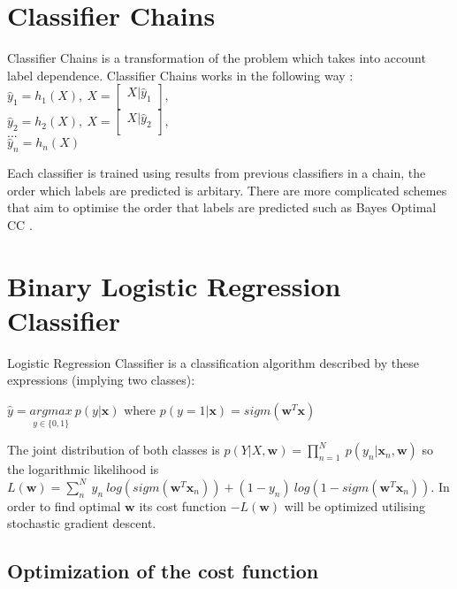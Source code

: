 \documentclass[10pt,letterpaper]{article}
\begin{document}
	\section*{Classifier Chains}
	Classifier Chains is a transformation of the problem which takes into account label dependence. Classifier Chains works in the following way \cite{MLC_finland}:\\ %
	$ 
	\hat{y}_{1} = h_{1}(X) ,  	\ 
	X = 	
	\begin{bmatrix}
		X	| \hat{y}_{1} \\
	\end{bmatrix}
	,$\\
	
	$ \hat{y}_{2} = h_{2}(X) ,  	\ 
	X = 	
	\begin{bmatrix}
	X	| \hat{y}_{2} \\
	\end{bmatrix} 
	,$
	\\
	$  	
	...  
	$
	\\
	$\hat{y}_{n} = h_{n}(X) $
	\newline
	
	Each classifier is trained using results from previous classifiers in a chain, the order which labels are predicted is %
	arbitary. There are more complicated schemes that aim to optimise the order that labels are predicted such as Bayes Optimal CC \cite{MLC_finland}.
	
	\section*{Binary Logistic Regression Classifier}
	Logistic Regression Classifier is a  classification algorithm described by these expressions (implying two classes): 
	
	$ \hat{y} = \underset{y \in \{0,1\} }{argmax}\  p(y|\textbf{x})
	$
	 where $
	 p(y = 1 | \textbf{x} )= sigm(\textbf{w}^T \textbf{x} )
	 $
	
	The joint distribution of both classes is $p(Y |X,\textbf{w}) = \prod_{n=1}^{N} \ p({y}_{n} | \textbf{x}_{n}, \textbf{w} )$
	 so the logarithmic likelihood is $
	 L(\textbf{w}) = \sum_{n}^{N} \ y_n \ log(sigm(\textbf{w}^T \textbf{x}_n)) + (1-y_n)\ log(1 - sigm(\textbf{w}^T \textbf{x}_n))
	 $.
	 In order to find optimal $\textbf{w}$ its cost function $-L(\textbf{w})$ will be optimized utilising stochastic gradient descent.
	 
	 \subsection*{Optimization of the cost function}
	 
\end{document}
